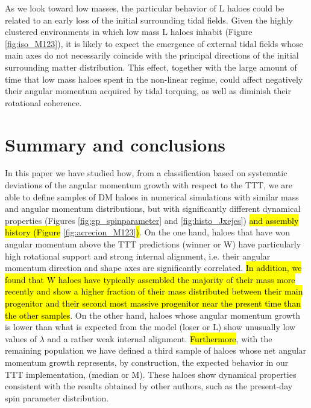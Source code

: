 \documentclass[fleqn,usenatbib]{mnras}
\newcommand{\Wh}{\mathrm{W}}
\newcommand{\Lh}{\mathrm{L}}
\newcommand{\Mh}{\mathrm{M}}
\begin{document}
As we look toward low masses, the particular behavior of $\Lh$ haloes could be related to an early loss of the initial surrounding tidal fields. Given the highly clustered environments in which low mass $\Lh$ haloes inhabit (Figure \ref{fig:iso_M123}), it is likely to expect the emergence of external tidal fields whose main axes do not necessarily coincide with the principal directions of the initial surrounding matter distribution. This effect, together with the large amount of time that low mass haloes spent in the non-linear regime, could affect negatively their angular momentum acquired by tidal torquing, as well as diminish their rotational coherence.

\section{Summary and conclusions}
\label{conclusions}

In this paper we have studied how, from a classification based on systematic deviations of the angular momentum growth with respect to the TTT, we are able to define samples of DM haloes in numerical simulations with similar mass and angular momentum distributions, but with significantly different dynamical properties (Figures \ref{fig:gp_spinparameter} and \ref{fig:histo_Jxejes}) \hl{and assembly history (Figure }\ref{fig:acrecion_M123}\hl{)}. On the one hand, haloes that have won angular momentum above the TTT predictions ({winner} or $\Wh$) have particularly high rotational support and strong internal alignment, i.e. their angular momentum direction and shape axes are significantly correlated. \hl{In addition, we found that $\Wh$ haloes have typically assembled the majority of their mass more recently and show a higher fraction of their mass distributed between their main progenitor and their second most massive progenitor near the present time than the other samples}. On the other hand, haloes whose angular momentum growth is lower than what is expected from the model ({loser} or $\Lh$) show unusually low values of $\lambda$ and a rather weak internal alignment. \hl{Furthermore}, with the remaining population we have defined a third sample of haloes whose net angular momentum growth represents, by construction, the expected behavior in our TTT implementation, ({median} or $\Mh$). These haloes show dynamical properties consistent with the results obtained by other authors, such as the present-day spin parameter distribution.
\end{document}
